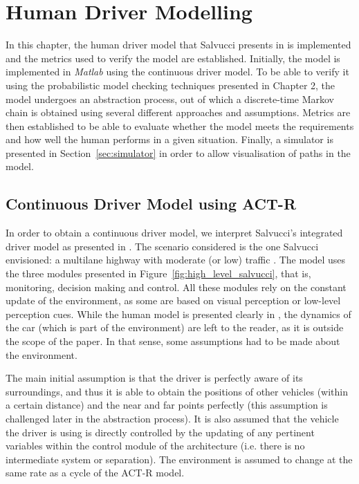 \chapter{Human Driver Modelling}

In this chapter, the human driver model that Salvucci presents in \cite{salvucci_1} is implemented and the metrics used to verify the model are established. Initially, the model is implemented in \textit{Matlab} using the continuous driver model. To be able to verify it using the probabilistic model checking techniques presented in Chapter 2, the model undergoes an abstraction process, out of which a discrete-time Markov chain is obtained using several different approaches and assumptions. Metrics are then established to be able to evaluate whether the model meets the requirements and how well the human performs in a given situation. Finally, a simulator is presented in Section~\ref{sec:simulator} in order to allow visualisation of paths in the model.

\section{Continuous Driver Model using ACT-R}

In order to obtain a continuous driver model, we interpret Salvucci's integrated driver model as presented in \cite{salvucci_1}. The scenario considered is the one Salvucci envisioned: a multilane highway with moderate (or low) traffic \cite{salvucci_1}. The model uses the three modules presented in Figure~\ref{fig:high_level_salvucci}, that is, monitoring, decision making and control. All these modules rely on the constant update of the environment, as some are based on visual perception or low-level perception cues. While the human model is presented clearly in \cite{salvucci_1}, the dynamics of the car (which is part of the environment) are left to the reader, as it is outside the scope of the paper. In that sense, some assumptions had to be made about the environment.

The main initial assumption is that the driver is perfectly aware of its surroundings, and thus it is able to obtain the positions of other vehicles (within a certain distance) and the near and far points perfectly (this assumption is challenged later in the abstraction process). It is also assumed that the vehicle the driver is using is directly controlled by the updating of any pertinent variables within the control module of the architecture (i.e. there is no intermediate system or separation). The environment is assumed to change at the same rate as a cycle of the ACT-R model.

